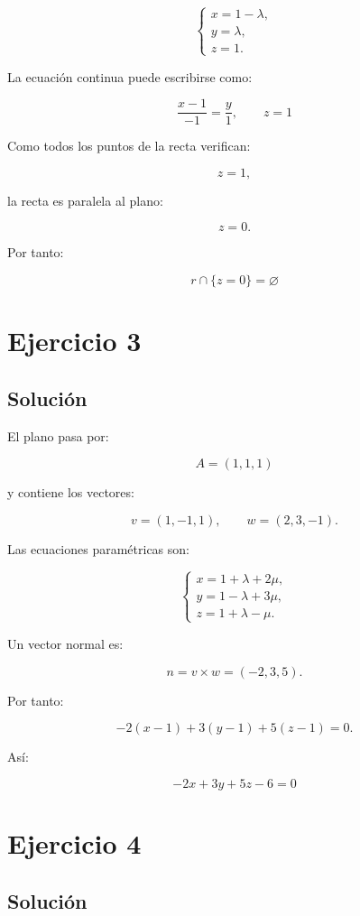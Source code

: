 \documentclass[11pt,a4paper]{article}
\begin{document}
\[
\boxed{
\begin{cases}
x=1-\lambda,\\
y=\lambda,\\
z=1.
\end{cases}
}
\]

La ecuación continua puede escribirse como:

\[
\boxed{
\frac{x-1}{-1}
=
\frac{y}{1},
\qquad
z=1
}
\]

Como todos los puntos de la recta verifican:

\[
z=1,
\]

la recta es paralela al plano:

\[
z=0.
\]

Por tanto:

\[
\boxed{
r\cap\{z=0\}
=
\varnothing
}
\]

\section{Ejercicio 3}
\subsection{Solución}

El plano pasa por:

\[
A=(1,1,1)
\]

y contiene los vectores:

\[
v=(1,-1,1),
\qquad
w=(2,3,-1).
\]

Las ecuaciones paramétricas son:

\[
\boxed{
\begin{cases}
x=1+\lambda+2\mu,\\
y=1-\lambda+3\mu,\\
z=1+\lambda-\mu.
\end{cases}
}
\]

Un vector normal es:

\[
n=v\times w
=
(-2,3,5).
\]

Por tanto:

\[
-2(x-1)+3(y-1)+5(z-1)=0.
\]

Así:

\[
\boxed{
-2x+3y+5z-6=0
}
\]

\section{Ejercicio 4}
\subsection{Solución}
\end{document}
